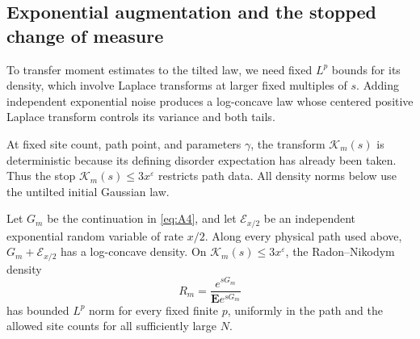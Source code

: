 \subsection{Exponential augmentation and the stopped change of measure}

To transfer moment estimates to the tilted law, we need fixed
\(L^p\) bounds for its density, which involve Laplace transforms at
larger fixed multiples of \(s\). Adding independent exponential
noise produces a log-concave law whose centered positive Laplace
transform controls its variance and both tails.

At fixed site count, path point, and parameters \(\gamma\), the
transform \(\mathcal K_m(s)\) is deterministic because its defining
disorder expectation has already been taken. Thus the stop
\(\mathcal K_m(s)\le3x^\varepsilon\) restricts path data. All density
norms below use the untilted initial Gaussian law.

\begin{lemma}\label{red:lem-augmentation}
Let \(G_m\) be the continuation in \eqref{eq:A4}, and let
\(\mathcal E_{x/2}\) be an independent exponential random variable of
rate \(x/2\). Along every physical path used above,
\(G_m+\mathcal E_{x/2}\) has a log-concave density. On
\(\mathcal K_m(s)\le3x^\varepsilon\), the Radon--Nikodym density
\[
 R_m=\frac{e^{sG_m}}{\mathbf E e^{sG_m}}
\]
has bounded \(L^p\) norm for every fixed finite \(p\), uniformly in
the path and the allowed site counts for all sufficiently large \(N\).
\end{lemma}

